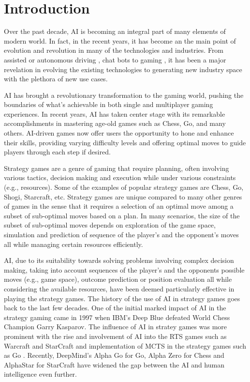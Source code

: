 \chapter{Introduction}

Over the past decade, \ac{AI} is becoming an integral part of many elements of modern world. In fact, in the recent years, it has become an the main point of evolution and revolution in many of the technologies and industries. From assisted or autonomous driving \citep{Ma2020Artificial}, chat bots \cite{Wu2023ABrief} to gaming \cite{Skinner2010Artificial}, it has been a major revelation in evolving the existing technologies to generating new industry space with the plethora of new use cases.   

\ac{AI} has brought a revolutionary transformation to the gaming world, pushing the boundaries
of what's achievable in both single and multiplayer gaming experiences. In recent years, \ac{AI} has taken center
stage with its remarkable accomplishments in mastering age-old games such as Chess, Go, and many others.
\ac{AI}-driven games now offer users the opportunity to hone and enhance their skills, providing varying difficulty
levels and offering optimal moves to guide players through each step if desired.

Strategy games are a genre of gaming that require planning, often involving various tactics, decision making and execution while under various constraints (e.g., resources). Some of the examples of popular strategy games are Chess, Go, Shogi, Starcraft, etc. Strategy games are unique compared to many other genres of games in the sense that it requires a selection of an optimal move among a subset of sub-optimal moves based on  a plan. In many scenarios, the size of the subset of sub-optimal moves depends on exploration of the game space, simulation and prediction of sequence of the player's and the opponent's moves all while managing certain resources efficiently.

\ac{AI}, due to its suitability towards solving problems involving complex decision making, taking into account sequences of the player's and the opponents possible moves (e.g., game space), outcome prediction or position evaluation all while considering the available resources, have been deemed particularly effective in playing the strategy games. The history of the use of \ac{AI} in strategy games goes back to the last few decades. One of the initial marked impact of \ac{AI} in the strategy gaming came in 1997 when IBM's Deep Blue \cite{Campbell2002Deep} defeated World Chess Champion Garry Kasparov. The influence of \ac{AI} in stratey games was more prominent with the rise and involvement of \ac{AI} into the \ac{RTS} games such as Warcraft and StarCraft \cite{Robertson2014Review} and implementation of \ac{MCTS} in the strategy games such as Go \cite{Huang2011Monte}. Recently, DeepMind's Alpha Go for Go, Alpha Zero for Chess \cite{Silver2017Mastering} and AlphaStar for StarCraft \cite{Team2019Alphastar} have widened the gap between the \ac{AI} and human intelligence even further.


